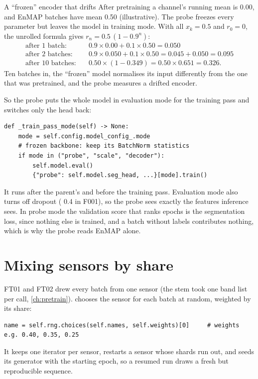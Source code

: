 \begin{worked}[label={we:finetune:drift}]{A ``frozen'' encoder that drifts}
After pretraining a channel's running mean is 0.00, and EnMAP batches have mean 0.50 (illustrative\tbrk\tagA). The probe freezes every parameter but leaves
the model in training mode. With all $x_k = 0.5$ and $r_0 = 0$, the unrolled formula gives $r_n = 0.5\,(1 - 0.9^n)$:
\begin{align*}
  \text{after 1 batch:}&\quad 0.9 \times 0.00 + 0.1 \times 0.50 = 0.050\\
  \text{after 2 batches:}&\quad 0.9 \times 0.050 + 0.1 \times 0.50 = 0.045 + 0.050 = 0.095\\
  \text{after 10 batches:}&\quad 0.50 \times (1 - 0.349) = 0.50 \times 0.651 = 0.326.
\end{align*}
Ten batches in, the ``frozen'' model normalises its input differently from the one that was pretrained, and the probe measures a drifted encoder.
\end{worked}

So the probe puts the whole model in evaluation mode for the training pass and switches only the head back:
\begin{lstlisting}
def _train_pass_mode(self) -> None:
    mode = self.config.model_config_.mode
    # frozen backbone: keep its BatchNorm statistics
    if mode in ("probe", "scale", "decoder"):
        self.model.eval()
        {"probe": self.model.seg_head, ...}[mode].train()
\end{lstlisting}
It runs after the parent's  and before the training pass. Evaluation mode also turns off dropout ( 0.4 in F001), so
the probe sees exactly the features inference sees. In probe mode the validation score that ranks epochs is the segmentation loss, since nothing else
is trained, and a batch without labels contributes nothing, which is why the probe reads EnMAP alone.

\section{Mixing sensors by share}\label{sec:finetune:shares}

FT01 and FT02 drew every batch from one sensor (the stem took one band list per call, \cref{ch:pretrain}).  chooses the sensor for
each batch at random, weighted by its share:
\begin{lstlisting}
name = self.rng.choices(self.names, self.weights)[0]     # weights e.g. 0.40, 0.35, 0.25
\end{lstlisting}
It keeps one iterator per sensor, restarts a sensor whose shards run out, and seeds its generator with the starting epoch, so a resumed run draws a
fresh but reproducible sequence.

